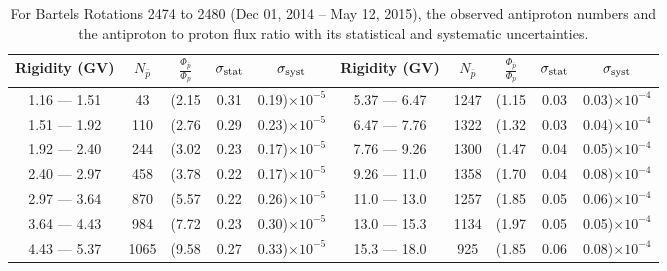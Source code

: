 \begin{table}[p] 
\renewcommand\baselinestretch{1.3}\selectfont
\setlength\tabcolsep{3pt}
\centering
\begin{tabular}{ccccc | ccccc}
\hline
\textbf{Rigidity}  (GV)  & $N_{\bar{p}}$ & $\frac{\Phi_{\bar{p}}}{\Phi_{p}}$ & $\sigma_{\rm{stat}}$ & $\sigma_{\rm{syst}}$ \hspace{1cm}   & \textbf{Rigidity}  (GV)  & $N_{\bar{p}}$ & $\frac{\Phi_{\bar{p}}}{\Phi_{p}}$ & $\sigma_{\rm{stat}}$ & $\sigma_{\rm{syst}}$ \hspace{1cm} \\ 
\hline
1.16 — 1.51   &  43                  &(2.15                          &  0.31              &      0.19)$\times 10^{-5}$  & 5.37 — 6.47                &  1247                    &(1.15                                &  0.03                   &      0.03)$\times 10^{-4}$\\
1.51 — 1.92   &  110                &(2.76                          &  0.29              &      0.23)$\times 10^{-5}$  & 6.47 — 7.76                &  1322                    &(1.32                                &  0.03                   &      0.04)$\times 10^{-4}$\\
1.92 — 2.40   &  244                &(3.02                          &  0.23              &      0.17)$\times 10^{-5}$  & 7.76 — 9.26                &  1300                    &(1.47                                &  0.04                   &      0.05)$\times 10^{-4}$\\    
2.40 — 2.97   &  458                &(3.78                          &  0.22              &      0.17)$\times 10^{-5}$  & 9.26 — 11.0                &  1358                    &(1.70                                &  0.04                   &      0.08)$\times 10^{-4}$\\    
2.97 — 3.64   &  870                &(5.57                          &  0.22              &      0.26)$\times 10^{-5}$  & 11.0 — 13.0                 &  1257                    &(1.85                                & 0.05                   &      0.06)$\times 10^{-4}$\\
3.64 — 4.43   &  984                &(7.72                          &  0.23              &      0.30)$\times 10^{-5}$  & 13.0 — 15.3               &  1134                    &(1.97                                &  0.05                   &      0.05)$\times 10^{-4}$\\
4.43 — 5.37   &  1065              &(9.58                          &  0.27              &      0.33)$\times 10^{-5}$  & 15.3 — 18.0               &  925                      &(1.85                                &  0.06                   &      0.08)$\times 10^{-4}$\\
\hline
\end{tabular}
\caption[Antiproton to proton flux ratio for Bartels Rotations 2474 to 2480]{For Bartels Rotations 2474 to 2480 (Dec 01, 2014 – May 12, 2015), the observed antiproton numbers and the antiproton to proton flux ratio with its statistical and systematic uncertainties.}
\label{TableOfDependent9}
\end{table}

